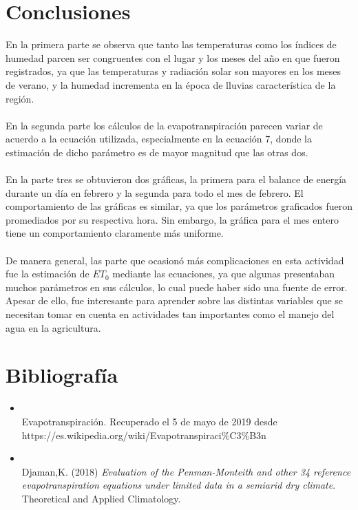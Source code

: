 \documentclass[letterpaper,12pt]{article}
\begin{document}
\section{Conclusiones}

En la primera parte se observa que tanto las temperaturas como los índices de humedad parcen ser congruentes con el lugar y los meses del año en que fueron registrados, ya que las temperaturas y radiación solar son mayores en los meses de verano, y la humedad incrementa en la época de lluvias característica de la región.
\\\\
En la segunda parte los cálculos de la evapotranspiración parecen variar de acuerdo a la ecuación utilizada, especialmente en la ecuación 7, donde la estimación de dicho parámetro es de mayor magnitud que las otras dos.
\\\\
En la parte tres se obtuvieron dos gráficas, la primera para el balance de energía durante un día en febrero y la segunda para todo el mes de febrero. El comportamiento de las gráficas es similar, ya que los parámetros graficados fueron promediados por su respectiva hora. Sin embargo, la gráfica para el mes entero tiene un comportamiento claramente más uniforme. 
\\\\
De manera general, las parte que ocasionó más complicaciones en esta actividad fue la estimación de $ET_{0}$ mediante las ecuaciones, ya que algunas presentaban muchos parámetros en sus cálculos, lo cual puede haber sido una fuente de error. Apesar de ello, fue interesante para aprender sobre las distintas variables que se necesitan tomar en cuenta en actividades tan importantes como el manejo del agua en la agricultura. 






\section*{Bibliografía}
\begin{itemize}

\item \\Evapotranspiración. Recuperado el 5 de mayo de 2019 desde \\https://es.wikipedia.org/wiki/Evapotranspiraci\%C3\%B3n
\\

\item \\ Djaman,K. (2018) \emph{Evaluation of the Penman-Monteith and other 34 reference evapotranspiration equations under limited data in a semiarid dry climate}. Theoretical and Applied Climatology.

\end{itemize}
\end{document}
